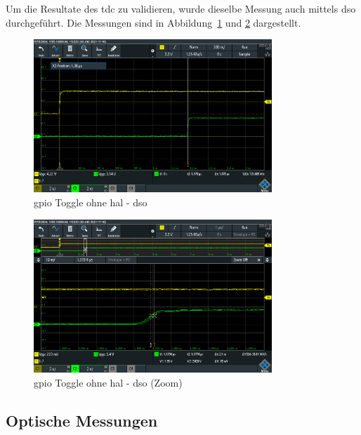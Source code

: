 \documentclass[11pt,a4paper,hidelinks]{article}
\begin{document}
Um die Resultate des \acrshort{tdc} zu validieren, wurde dieselbe Messung auch mittels \acrfull{dso} durchgeführt. Die
Messungen sind in Abbildung~\ref{fig:gpio_toggle_without_hal_dso} und \ref{fig:gpio_toggle_without_hal_dso_zoom}
dargestellt.

\begin{figure}[H]
    \centering
    \includegraphics[width=0.8\textwidth]{graphics/gpio_toggle_without_hal_dso.png}
    \caption{\acrshort{gpio} Toggle ohne \acrshort{hal} - \acrshort{dso}}\label{fig:gpio_toggle_without_hal_dso}
\end{figure}

\begin{figure}[H]
    \centering
    \includegraphics[width=0.8\textwidth]{graphics/gpio_toggle_without_hal_dso_zoom.png}
    \caption{\acrshort{gpio} Toggle ohne \acrshort{hal} - \acrshort{dso} (Zoom)}\label{fig:gpio_toggle_without_hal_dso_zoom}
\end{figure}

\pagebreak

\subsection{Optische Messungen}
\end{document}
